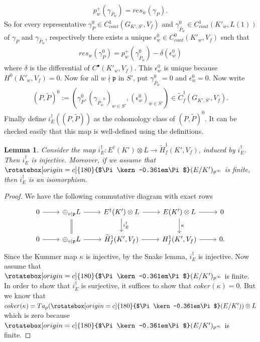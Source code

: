 \documentclass[reqno,10pt]{amsart}
\newcommand{\p}{\mathfrak{p}}
\newcommand{\Varpi}{\rotatebox[origin=c]{180}{$\Pi\kern-0.361em\Pi$}}
\theoremstyle{plain}
\newtheorem{lem}[thm]{Lemma}
\theoremstyle{definition}
\begin{document}
\begin{align*}
   p_w^+(\gamma_{\widetilde{P_w}}) = res_w(\gamma_P). 
\end{align*}
So for every representative $\gamma_P^0 \in C^1_{cont}(G_{K',S'},V_f)$ and $\gamma_{\widetilde{P_w}}^0 \in C^1_{cont}(K'_w,L(1))$ of $\gamma_P$ and $\gamma_{\widetilde{P_w}}$, respectively there exists a unique $\epsilon_w^0 \in C^0_{cont}(K'_w,V_f)$ such that
\begin{align*}
    res_w(\gamma_P^0) = p_w^+(\gamma_{\widetilde{P_w}}^0) - \delta(\epsilon_w^0)
\end{align*}
where $\delta$ is the differential of $C^\bullet(K'_w,V_f).$ This $\epsilon_w^0$ is unique because $H^0(K'_w,V_f) = 0$. Now for all $w \nmid \p$ in $S'$, put $\gamma_{\widetilde{P_w}}^0 = 0$ and $\epsilon_w^0 = 0$. 
Now write 
\begin{align*}
    (P,\widetilde{P})^0 := \left( \gamma_P^0,(\gamma_{\widetilde{P_w}^0})_{w \in S'}, (\epsilon_w^0)_{w \in S'} \right) \in \widetilde{C}^1_f(G_{K',S'},V_f).
\end{align*}
Finally define $i_E^\dagger((P,\widetilde{P}))$ as the cohomology class of $(P,\widetilde{P})^0$. It can be checked easily that this map is well-defined using the definitions.

\begin{lem} \label{iedagger is an iso}
    Consider the map $i_E^\dagger : E^\dagger(K') \otimes L \rightarrow \widetilde{H}^1_f(K',V_f)$, induced by $i_E^\dagger$. Then $i_E^\dagger$ is injective. Moreover, if we assume that $\Varpi(E/K')_{p^\infty}$ is finite, then $i_E^\dagger$ is an isomorphism.
\end{lem}

\begin{proof}
    We have the following commutative diagram with exact rows
    $$
    \begin{tikzcd}
	   0 \arrow[r] & 
      \oplus_{v|\p} L \arrow[r] \arrow[d,equal] &
	   E^\dagger(K') \otimes L \arrow[r,'] \arrow[d,"i_E^\dagger"] &
	   E(K') \otimes L \arrow[r] \arrow[d,"\kappa"] &
	   0
	   \\
	   0 \arrow[r] &
	   \oplus_{v|\p} L \arrow[r] &
	   \widetilde{H}^1_f(K',V_f) \arrow[r] &
	   H^1_f(K',V_f) \arrow[r] &
	   0.
    \end{tikzcd}
    $$
    Since the Kummer map $\kappa$ is injective, by the Snake lemma, $i_E^\dagger$ is injective. Now assume that $\Varpi(E/K')_{p^\infty}$ is finite. In order to show that $i_E^\dagger$ is surjective, it suffices to show that $coker(\kappa) = 0$. But we know that $coker(\kappa) = Ta_p(\Varpi(E/K')) \otimes L$ which is zero because $\Varpi(E/K')_{p^\infty}$ is finite. 
\end{proof}
\end{document}
